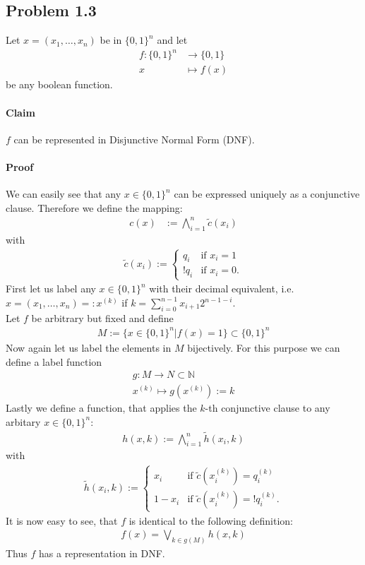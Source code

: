 \subsection*{Problem 1.3}
Let $x = (x_1, \ldots , x_n)$ be in $\{0,1\}^n$ and let
\begin{align*}
	f:\{0,1\}^n &\rightarrow \{0,1\}\\
		x&\mapsto f(x)
\end{align*}
be any boolean function.

\paragraph{Claim}
$f$ can be represented in Disjunctive Normal Form (DNF).

\paragraph{Proof}
We can easily see that any $x\in\{0,1\}^n$ can be expressed uniquely as a conjunctive clause. 
Therefore we define the mapping:
\begin{align*}
	c(x) &:= \bigwedge _{i=1}^{n}\tilde{c}({x}_ i)
\end{align*}
with
\begin{align*}
\tilde{c}({x}_ i) := 
\begin{cases} 
	q _i &\mbox{if } x _i = 1 \\ 
	!q _i & \mbox{if } x _i = 0. 
\end{cases} 
\end{align*}
First let us label any $x\in\{0,1\}^n$ with their decimal equivalent, i.e.
$x = (x_1, \ldots , x_n)=: x^{(k)}$ if $k = \sum _{i=0}^{n-1} x_{i+1}2^{n-1-i}$.\\
Let $f$ be arbitrary but fixed and define
\begin{align*}
	M:= \{x\in\{0,1\}^n | f(x)=1 \} \subset \{0,1\}^n
\end{align*}
Now again let us label the elements in $M$ bijectively.
For this purpose we can define a label function 
\begin{align*}
	g:M \rightarrow N\subset \mathbb{N}\\
	x^{(k)} \mapsto g(x^{(k)}):= k
\end{align*} 
Lastly we define a function, that applies the $k$-th conjunctive clause to any arbitary $x\in\{0,1\}^n$:
\begin{align*}
	h(x,k):= \bigwedge _{i=1}^{n}\tilde{h}({x}_ i,k)
\end{align*}
with
\begin{align*}
\tilde{h}({x}_ i,k) := 
\begin{cases} 
	x_i &\mbox{if } \tilde{c}(x _i^{(k)}) = q_i^{(k)} \\ 
	1-x_i & \mbox{if }\tilde{c}(x _i^{(k)}) = !q_i^{(k)} . 
\end{cases} 
\end{align*}
It is now easy to see, that $f$ is identical to the following definition:
\begin{align*}
	f(x) =  \bigvee _{k\in g(M)} h(x,k) 
\end{align*}
Thus $f$ has a representation in DNF.

